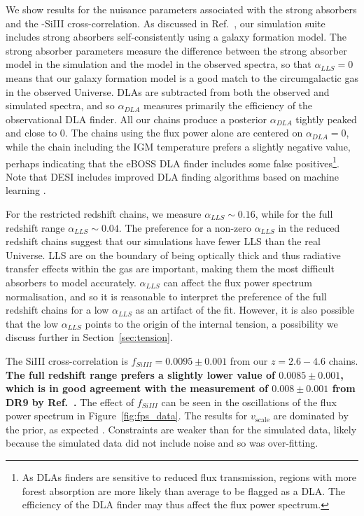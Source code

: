 We show results for the nuisance parameters associated with the strong absorbers and the \Lya-SiIII cross-correlation.
As discussed in Ref.~\cite{2023simsuite}, our simulation suite includes strong absorbers self-consistently using a galaxy formation model.
The strong absorber parameters measure the difference between the strong absorber model in the simulation and the model in the observed spectra, so that $\alpha_{LLS} = 0$ means that our galaxy formation model is a good match to the circumgalactic gas in the observed Universe.
DLAs are subtracted from both the observed and simulated spectra, and so $\alpha_{DLA}$ measures primarily the efficiency of the observational DLA finder. 
All our chains produce a posterior $\alpha_{DLA}$ tightly peaked and close to $0$.
The chains using the flux power alone are centered on $\alpha_{DLA} = 0$, while the chain including the IGM temperature prefers a slightly negative value, perhaps indicating that the eBOSS DLA finder includes some false positives\footnote{As DLAs finders are sensitive to reduced flux transmission, regions with more \Lya forest absorption are more likely than average to be flagged as a DLA. The efficiency of the DLA finder may thus affect the flux power spectrum.}.
Note that DESI includes improved DLA finding algorithms based on machine learning \cite{Ho:2020,Parks:2018, 2022arXiv220100827W}.

For the restricted redshift chains, we measure $\alpha_{LLS} \sim 0.16$, while for the full redshift range $\alpha_{LLS} \sim 0.04$.
The preference for a non-zero $\alpha_{LLS}$ in the reduced redshift chains suggest that our simulations have fewer LLS than the real Universe.
LLS are on the boundary of being optically thick and thus radiative transfer effects within the gas are important, making them the most difficult absorbers to model accurately.
$\alpha_{LLS}$ can affect the flux power spectrum normalisation, and so it is reasonable to interpret the preference of the full redshift chains for a low $\alpha_{LLS}$ as an artifact of the fit.
However, it is also possible that the low $\alpha_{LLS}$ points to the origin of the internal tension, a possibility we discuss further in Section~\ref{sec:tension}. 

The SiIII cross-correlation is $f_{SiIII} = 0.0095 \pm 0.001$ from our $z=2.6 - 4.6$ chains.
\textbf{The full redshift range prefers a slightly lower value of $0.0085 \pm 0.001$, which is in good agreement with the measurement of $0.008 \pm 0.001$ from DR9 by Ref.~\cite{2013A&A...559A..85P}.}
The effect of $f_{SiIII}$ can be seen in the oscillations of the flux power spectrum in Figure~\ref{fig:fps_data}.
The results for $v_\mathrm{scale}$ are dominated by the prior, as expected \cite{2015JCAP...11..011P, 2020JCAP...04..038P}.
Constraints are weaker than for the simulated data, likely because the simulated data did not include noise and so was over-fitting.

